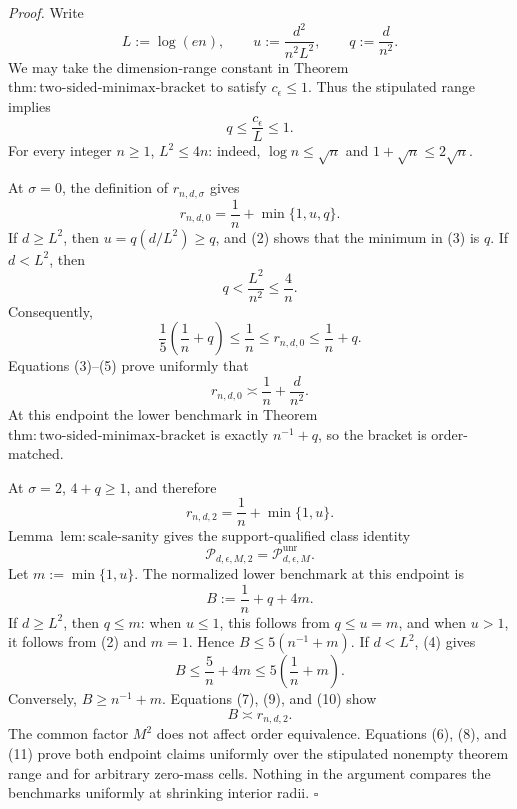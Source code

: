 \textit{Proof.}
Write
\[
L:=\log(en),\qquad
u:=\frac{d^2}{n^2L^2},\qquad
q:=\frac d{n^2}.
\tag{1}
\]
We may take the dimension-range constant in Theorem~\(\mathrm{thm:two\text{-}sided\text{-}minimax\text{-}bracket}\) to satisfy \(c_{\epsilon}\le1\).  Thus the stipulated range implies
\[
q\le\frac{c_{\epsilon}}L\le1.
\tag{2}
\]
For every integer \(n\ge1\), \(L^2\le4n\): indeed, \(\log n\le\sqrt n\) and \(1+\sqrt n\le2\sqrt n\).

At \(\sigma=0\), the definition of \(r_{n,d,\sigma}\) gives
\[
r_{n,d,0}=\frac1n+\min\{1,u,q\}.
\tag{3}
\]
If \(d\ge L^2\), then \(u=q(d/L^2)\ge q\), and (2) shows that the minimum in (3) is \(q\).  If \(d<L^2\), then
\[
q<\frac{L^2}{n^2}\le\frac4n.
\tag{4}
\]
Consequently,
\[
\frac15\left(\frac1n+q\right)
\le\frac1n
\le r_{n,d,0}
\le\frac1n+q.
\tag{5}
\]
Equations (3)--(5) prove uniformly that
\[
r_{n,d,0}\asymp\frac1n+\frac d{n^2}.
\tag{6}
\]
At this endpoint the lower benchmark in Theorem~\(\mathrm{thm:two\text{-}sided\text{-}minimax\text{-}bracket}\) is exactly \(n^{-1}+q\), so the bracket is order-matched.

At \(\sigma=2\), \(4+q\ge1\), and therefore
\[
r_{n,d,2}=\frac1n+\min\{1,u\}.
\tag{7}
\]
Lemma~\(\mathrm{lem:scale\text{-}sanity}\) gives the support-qualified class identity
\[
\mathcal P_{d,\epsilon,M,2}=\mathcal P_{d,\epsilon,M}^{\mathrm{unr}}.
\tag{8}
\]
Let \(m:=\min\{1,u\}\).  The normalized lower benchmark at this endpoint is
\[
B:=\frac1n+q+4m.
\tag{9}
\]
If \(d\ge L^2\), then \(q\le m\): when \(u\le1\), this follows from \(q\le u=m\), and when \(u>1\), it follows from (2) and \(m=1\).  Hence \(B\le5(n^{-1}+m)\).  If \(d<L^2\), (4) gives
\[
B\le\frac5n+4m\le5\left(\frac1n+m\right).
\tag{10}
\]
Conversely, \(B\ge n^{-1}+m\).  Equations (7), (9), and (10) show
\[
B\asymp r_{n,d,2}.
\tag{11}
\]
The common factor \(M^2\) does not affect order equivalence.  Equations (6), (8), and (11) prove both endpoint claims uniformly over the stipulated nonempty theorem range and for arbitrary zero-mass cells.  Nothing in the argument compares the benchmarks uniformly at shrinking interior radii. \(\square\)